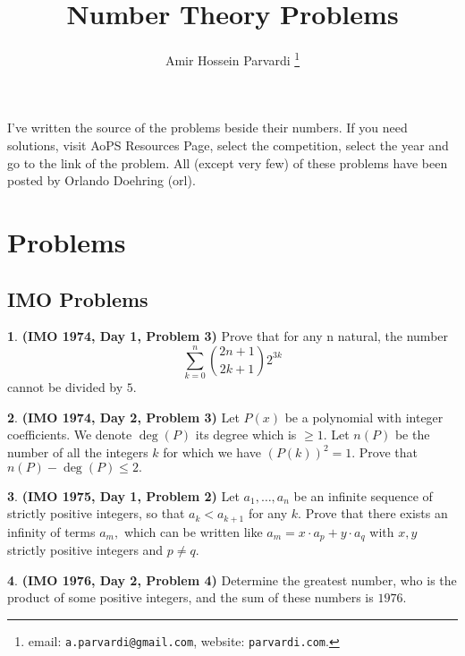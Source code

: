 \documentclass{article}
\theoremstyle{definition}
\newtheorem{p}{}
\begin{document}
\title{Number Theory Problems}\author{Amir Hossein Parvardi \thanks {email: \texttt{a.parvardi@gmail.com}, website: \texttt{parvardi.com}.}} \maketitle 
I've written the source of the problems beside their numbers. If you need solutions, visit AoPS Resources Page, select the competition, select the year and go to the link of the problem. All (except very few) of these problems have been posted by Orlando Doehring (orl).

\tableofcontents

\section{Problems}

\subsection{IMO Problems}




\begin{p}{\bf (IMO 1974, Day 1, Problem 3)}
Prove that for any n natural, the number \[ \sum \limits_{k=0}^{n} \binom{2n+1}{2k+1} 2^{3k}  \]
cannot be divided by $5$.
\end{p}


\begin{p}{\bf (IMO 1974, Day 2, Problem 3)}
Let $P(x)$ be a polynomial with integer coefficients. We denote $\deg(P)$ its degree which is $\geq 1.$ Let $n(P)$ be the number of all the integers $k$ for which we have $(P(k))^{2}=1.$ Prove that $n(P)- \deg(P) \leq 2.$
\end{p}



\begin{p}{\bf (IMO 1975, Day 1, Problem 2)}
Let $a_{1}, \ldots, a_{n}$ be an infinite sequence of strictly positive integers, so that $a_{k} < a_{k+1}$ for any $k.$ Prove that there exists an infinity of terms $a_{m},$ which can be written like $a_m = x \cdot a_p + y \cdot a_q$ with $x,y$ strictly positive integers and $p \neq q.$
\end{p}





\begin{p}{\bf (IMO 1976, Day 2, Problem 4)}
Determine the greatest number, who is the product of some positive integers, and the sum of these numbers is $1976.$
\end{p}
\end{document}
